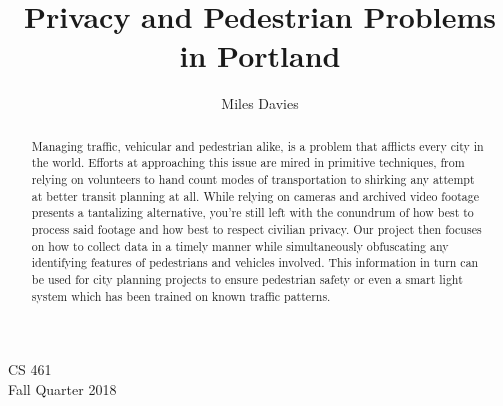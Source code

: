 \documentclass[letterpaper,10pt,draftclsnofoot,onecolumn]{IEEEtran}
\title{Privacy and Pedestrian Problems in Portland}
\author{Miles Davies}
\date{}
\begin{document}
\begin{titlingpage}
\maketitle

\thispagestyle{empty}
\begin{center}
CS 461\\
Fall Quarter 2018
\end{center}
\vfill
\begin{abstract}
Managing traffic, vehicular and pedestrian alike, is a problem that afflicts every city in the world. Efforts at approaching this issue are mired in primitive techniques, from relying on volunteers to hand count modes of transportation to shirking any attempt at better transit planning at all. While relying on cameras and archived video footage presents a tantalizing alternative, you’re still left with the conundrum of how best to process said footage and how best to respect civilian privacy. Our project then focuses on how to collect data in a timely manner while simultaneously obfuscating any identifying features of pedestrians and vehicles involved. This information in turn can be used for city planning projects to ensure pedestrian safety or even a smart light system which has been trained on known traffic patterns.
\end{abstract}
\end{titlingpage}
\end{document}
